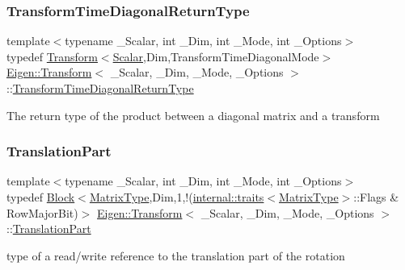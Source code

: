 \subsubsection{\texorpdfstring{TransformTimeDiagonalReturnType}{TransformTimeDiagonalReturnType}}
{\footnotesize\ttfamily template$<$typename \+\_\+\+Scalar, int \+\_\+\+Dim, int \+\_\+\+Mode, int \+\_\+\+Options$>$ \\
typedef \mbox{\hyperlink{class_eigen_1_1_transform}{Transform}}$<$\mbox{\hyperlink{class_eigen_1_1_transform_a4e69ced9d651745b8ed4eda46f41795d}{Scalar}},Dim,Transform\+Time\+Diagonal\+Mode$>$ \mbox{\hyperlink{class_eigen_1_1_transform}{Eigen\+::\+Transform}}$<$ \+\_\+\+Scalar, \+\_\+\+Dim, \+\_\+\+Mode, \+\_\+\+Options $>$\+::\mbox{\hyperlink{class_eigen_1_1_transform_a51af5e8d8d9d9bfec091ff8aa5b7845a}{Transform\+Time\+Diagonal\+Return\+Type}}}

The return type of the product between a diagonal matrix and a transform \mbox{\label{class_eigen_1_1_transform_aabeaa2d375bf1b6b1d5cb5d1904fbd06}} 
\subsubsection{\texorpdfstring{TranslationPart}{TranslationPart}}
{\footnotesize\ttfamily template$<$typename \+\_\+\+Scalar, int \+\_\+\+Dim, int \+\_\+\+Mode, int \+\_\+\+Options$>$ \\
typedef \mbox{\hyperlink{class_eigen_1_1_block}{Block}}$<$\mbox{\hyperlink{class_eigen_1_1_transform_a30f72ba46abc2bb3c7fa919c1078fc9c}{Matrix\+Type}},Dim,1,!(\mbox{\hyperlink{struct_eigen_1_1internal_1_1traits}{internal\+::traits}}$<$\mbox{\hyperlink{class_eigen_1_1_transform_a30f72ba46abc2bb3c7fa919c1078fc9c}{Matrix\+Type}}$>$\+::Flags \& Row\+Major\+Bit)$>$ \mbox{\hyperlink{class_eigen_1_1_transform}{Eigen\+::\+Transform}}$<$ \+\_\+\+Scalar, \+\_\+\+Dim, \+\_\+\+Mode, \+\_\+\+Options $>$\+::\mbox{\hyperlink{class_eigen_1_1_transform_aabeaa2d375bf1b6b1d5cb5d1904fbd06}{Translation\+Part}}}

type of a read/write reference to the translation part of the rotation \mbox{\label{class_eigen_1_1_transform_a6b463d14d8be4c0eda2eed6e943b831f}} 

